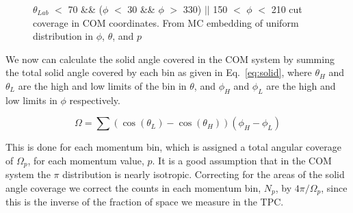 \documentclass[12pt, letterpaper, twoside]{article}
\begin{document}
\begin{figure}
\begin{adjustbox}{max width=1.2\linewidth,center}
\centering
{}%
%
%
\end{adjustbox}
\caption{$\theta_{Lab}$ $<$ 70 \&\& ($\phi$ $<$ 30 \&\& $\phi$ $>$ 330) $||$ 150 $<$ $\phi$ $<$ 210 cut coverage in COM coordinates. From MC embedding of uniform distribution in $\phi$, $\theta$, and $p$}
\end{figure}
 
 We now can calculate the solid angle covered in the COM system by summing the total solid angle covered by each bin as given in Eq.~\ref{eq:solid}, where $\theta_H$ and $\theta_L$ are the high and low limits of the bin in $\theta$, and $\phi_H$ and $\phi_L$ are the high and low limits in $\phi$ respectively. 
 
 \begin{equation}
 \Omega = \sum (\cos(\theta_L) - \cos(\theta_H))(\phi_H - \phi_L)
 \label{eq:solid}
 \end{equation}
 
 This is done for each momentum bin, which is assigned a total angular coverage of $\Omega_p$, for each momentum value, $p$. It is a good assumption that in the COM system the $\pi$ distribution is nearly isotropic. Correcting for the areas of the solid angle coverage we correct the counts in each momentum bin, $N_p$, by ${4\pi/\Omega_p}$, since this is the inverse of the fraction of space we measure in the TPC. 
 
\end{document}
